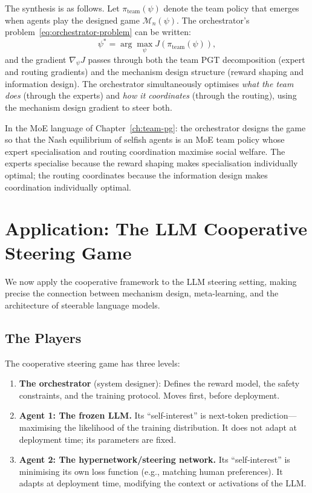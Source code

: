 The synthesis is as follows. Let $\pi_{\mathrm{team}}(\psi)$ denote the team policy that emerges when agents play the designed game $\mathcal{M}_n(\psi)$. The orchestrator's problem~\eqref{eq:orchestrator-problem} can be written:
\begin{equation}\label{eq:orchestrator-team}
  \psi^* = \arg\max_\psi J\!\left(\pi_{\mathrm{team}}(\psi)\right),
\end{equation}
and the gradient $\nabla_\psi J$ passes through both the team PGT decomposition (expert and routing gradients) and the mechanism design structure (reward shaping and information design). The orchestrator simultaneously optimises \emph{what the team does} (through the experts) and \emph{how it coordinates} (through the routing), using the mechanism design gradient to steer both.

In the MoE language of Chapter~\ref{ch:team-pg}: the orchestrator designs the game so that the Nash equilibrium of selfish agents is an MoE team policy whose expert specialisation and routing coordination maximise social welfare. The experts specialise because the reward shaping makes specialisation individually optimal; the routing coordinates because the information design makes coordination individually optimal.

\section{Application: The LLM Cooperative Steering Game}
\label{sec:llm-coop-steering}

We now apply the cooperative framework to the LLM steering setting, making precise the connection between mechanism design, meta-learning, and the architecture of steerable language models.

\subsection{The Players}
\label{subsec:llm-players}

The cooperative steering game has three levels:
\begin{enumerate}[label=(\roman*)]
  \item \textbf{The orchestrator} (system designer): Defines the reward model, the safety constraints, and the training protocol. Moves first, before deployment.
  \item \textbf{Agent 1: The frozen LLM.} Its ``self-interest'' is next-token prediction---maximising the likelihood of the training distribution. It does not adapt at deployment time; its parameters are fixed.
  \item \textbf{Agent 2: The hypernetwork/steering network.} Its ``self-interest'' is minimising its own loss function (e.g., matching human preferences). It adapts at deployment time, modifying the context or activations of the LLM.
\end{enumerate}

